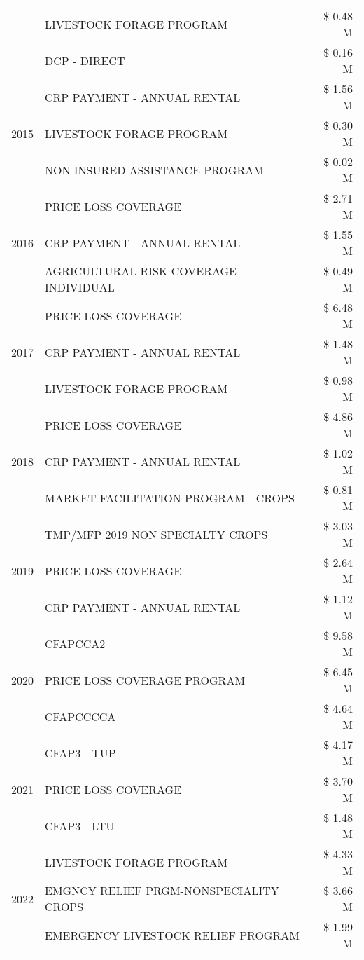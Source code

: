 \begin{tabular}{llr}
 & LIVESTOCK FORAGE PROGRAM & \$ 0.48 M \\
 & DCP - DIRECT & \$ 0.16 M \\
\cline{1-3}
\multirow[t]{3}{*}{2015} & CRP PAYMENT - ANNUAL RENTAL & \$ 1.56 M \\
 & LIVESTOCK FORAGE PROGRAM & \$ 0.30 M \\
 & NON-INSURED ASSISTANCE PROGRAM & \$ 0.02 M \\
\cline{1-3}
\multirow[t]{3}{*}{2016} & PRICE LOSS COVERAGE & \$ 2.71 M \\
 & CRP PAYMENT - ANNUAL RENTAL & \$ 1.55 M \\
 & AGRICULTURAL RISK COVERAGE - INDIVIDUAL & \$ 0.49 M \\
\cline{1-3}
\multirow[t]{3}{*}{2017} & PRICE LOSS COVERAGE & \$ 6.48 M \\
 & CRP PAYMENT - ANNUAL RENTAL & \$ 1.48 M \\
 & LIVESTOCK FORAGE PROGRAM & \$ 0.98 M \\
\cline{1-3}
\multirow[t]{3}{*}{2018} & PRICE LOSS COVERAGE & \$ 4.86 M \\
 & CRP PAYMENT - ANNUAL RENTAL & \$ 1.02 M \\
 & MARKET FACILITATION PROGRAM - CROPS & \$ 0.81 M \\
\cline{1-3}
\multirow[t]{3}{*}{2019} & TMP/MFP 2019 NON SPECIALTY CROPS & \$ 3.03 M \\
 & PRICE LOSS COVERAGE & \$ 2.64 M \\
 & CRP PAYMENT - ANNUAL RENTAL & \$ 1.12 M \\
\cline{1-3}
\multirow[t]{3}{*}{2020} & CFAPCCA2 & \$ 9.58 M \\
 & PRICE LOSS COVERAGE PROGRAM & \$ 6.45 M \\
 & CFAPCCCCA & \$ 4.64 M \\
\cline{1-3}
\multirow[t]{3}{*}{2021} & CFAP3 - TUP & \$ 4.17 M \\
 & PRICE LOSS COVERAGE & \$ 3.70 M \\
 & CFAP3 - LTU & \$ 1.48 M \\
\cline{1-3}
\multirow[t]{3}{*}{2022} & LIVESTOCK FORAGE PROGRAM & \$ 4.33 M \\
 & EMGNCY RELIEF PRGM-NONSPECIALITY CROPS & \$ 3.66 M \\
 & EMERGENCY LIVESTOCK RELIEF PROGRAM & \$ 1.99 M \\
\cline{1-3}
\bottomrule
\end{tabular}
